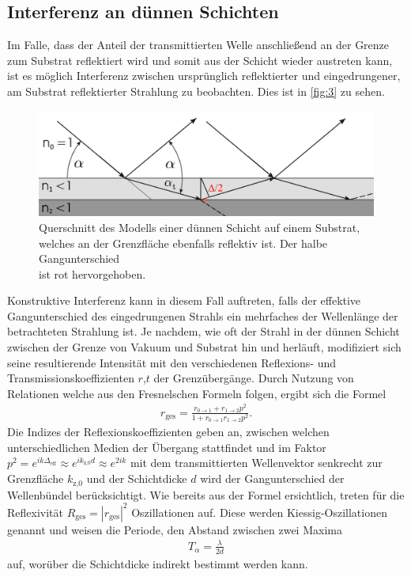 \documentclass[12pt]{article}
\begin{document}
\subsection{Interferenz an dünnen Schichten}\label{subsec:interferenz}
Im Falle, dass der Anteil der transmittierten Welle anschließend an der Grenze zum Substrat reflektiert wird und somit aus der Schicht wieder austreten kann, ist es möglich Interferenz zwischen ursprünglich reflektierter und eingedrungener, am Substrat reflektierter Strahlung zu beobachten. Dies ist in \autoref{fig:3} zu sehen.
\begin{figure}[H]
  \centering
  \includegraphics[scale=0.3]{Ressourcen/schicht.png}
  \caption{Querschnitt des Modells einer dünnen Schicht auf einem Substrat,\\ welches an der Grenzfläche ebenfalls reflektiv ist. Der halbe Gangunterschied \\ ist rot hervorgehoben.}\label{fig:3}
\end{figure}
Konstruktive Interferenz kann in diesem Fall auftreten, falls der effektive Gangunterschied des eingedrungenen Strahls ein mehrfaches der Wellenlänge der betrachteten Strahlung ist.
Je nachdem, wie oft der Strahl in der dünnen Schicht zwischen der Grenze von Vakuum und Substrat hin und herläuft, modifiziert sich seine resultierende Intensität mit den verschiedenen Reflexions- und Transmissionskoeffizienten $r$,$t$ der Grenzübergänge.
Durch Nutzung von Relationen welche aus den Fresnelschen Formeln folgen, ergibt sich die Formel
\begin{align}
  r_\text{ges}= \frac{r_{0\to1}+r_{1\to2}p^2}{1+r_{0\to1}r_{1\to2}p^2}\text{.}\label{eqn:schicht}
\end{align}
Die Indizes der Reflexionskoeffizienten geben an, zwischen welchen unterschiedlichen Medien der Übergang stattfindet und im Faktor $p^2=e^{ik\Delta_\text{eff}}\approx e^{ik_\text{z,0}d} \approx e^{2ik}$ mit dem transmittierten Wellenvektor senkrecht zur Grenzfläche $k_\text{z,0}$ und der Schichtdicke $d$ wird der Gangunterschied der Wellenbündel berücksichtigt.
Wie bereits aus der Formel ersichtlich, treten für die Reflexivität $R_\text{ges}=|r_\text{ges}|^2$ Oszillationen auf.
Diese werden Kiessig-Oszillationen genannt und weisen die Periode, den Abstand zwischen zwei Maxima 
\begin{align}
  T_\alpha = \frac{\lambda}{2d}
\end{align}
auf, worüber die Schichtdicke indirekt bestimmt werden kann\cite{kiessig}.
\end{document}
